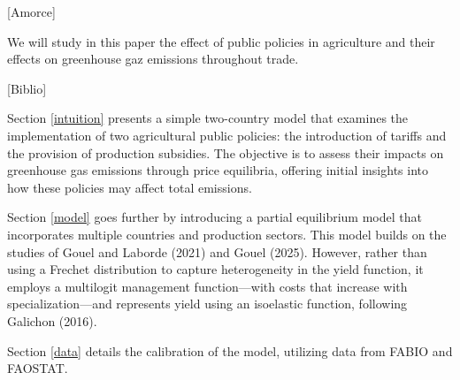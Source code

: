 [Amorce]

We will study in this paper the effect of public policies in agriculture and their effects on greenhouse gaz emissions throughout trade.

[Biblio]

Section \ref{intuition} presents a simple two-country model that examines the implementation of two agricultural public policies: the introduction of tariffs and the provision of production subsidies. The objective is to assess their impacts on greenhouse gas emissions through price equilibria, offering initial insights into how these policies may affect total emissions.

Section \ref{model} goes further by introducing a partial equilibrium model that incorporates multiple countries and production sectors. This model builds on the studies of Gouel and Laborde (2021) and Gouel (2025). However, rather than using a Frechet distribution to capture heterogeneity in the yield function, it employs a multilogit management function—with costs that increase with specialization—and represents yield using an isoelastic function, following Galichon (2016).

Section \ref{data} details the calibration of the model, utilizing data from FABIO and FAOSTAT.

